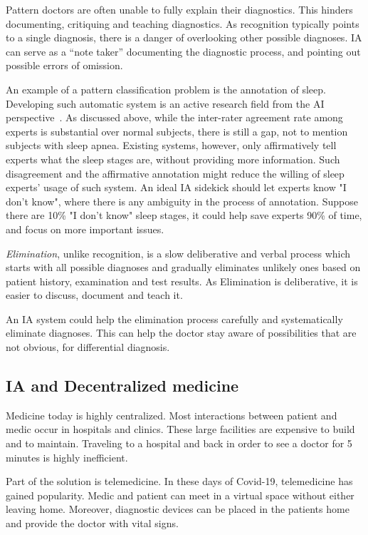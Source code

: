 \documentclass[11pt]{pnas-new}
\begin{document}
Pattern doctors are often unable to fully explain their diagnostics.
This hinders documenting, critiquing and teaching diagnostics. As
recognition typically points to a single diagnosis, there is a danger
of overlooking other possible diagnoses. IA can serve as a ``note
taker'' documenting the diagnostic process, and pointing out possible
errors of omission. 

An example of a pattern classification problem is the annotation of
sleep. Developing such automatic system is an
active research field from the AI perspective~\cite{HTaddCite}. As discussed above,
while the inter-rater agreement rate among experts is substantial over
normal subjects, there is still a gap, not to mention subjects with
sleep apnea. Existing systems, however, only affirmatively tell
experts what the sleep stages are, without providing more
information. Such disagreement and the affirmative annotation might
reduce the willing of sleep experts' usage of such system. An ideal IA
sidekick should let experts know "I don't know", where there is any
ambiguity in the process of annotation. Suppose there are 10\% "I
don't know" sleep stages, it could help save experts 90\% of time, and
focus on more important issues.

{\em Elimination}, unlike recognition, is a slow deliberative and
verbal process which starts with all possible diagnoses and gradually
eliminates unlikely ones based on patient history, examination and
test results. As Elimination is deliberative, it is easier to discuss,
document and teach it.

An IA system could help the elimination process carefully and
systematically eliminate diagnoses. This can help the doctor stay
aware of possibilities that are not obvious, for differential
diagnosis.


\subsection{IA and Decentralized medicine}

Medicine today is highly centralized. Most interactions
between patient and medic occur in hospitals and clinics. These
large facilities are expensive to build and to maintain. Traveling to
a hospital and back in order to see a doctor for 5 minutes is highly
inefficient. 

Part of the solution is telemedicine. In these days of Covid-19,
telemedicine has gained popularity. Medic and patient can meet in a
virtual space without either leaving home. Moreover, diagnostic
devices can be placed in the patients home and provide the doctor with
vital signs.
\end{document}

